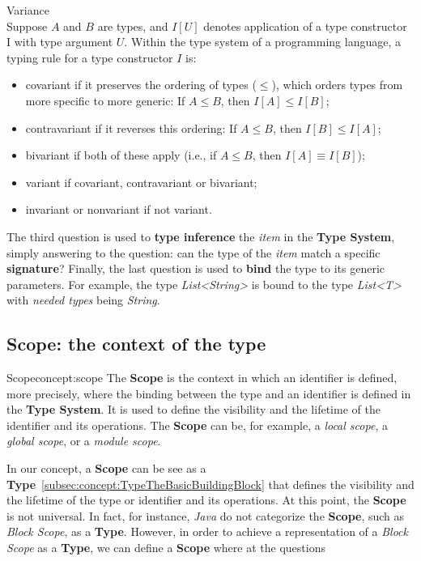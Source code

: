 \begin{definition}{Variance}\\
    Suppose $A$ and $B$ are types, and $I[U]$ denotes application of a type constructor I with type argument $U$. Within the type system of a programming language, a typing rule for a type constructor $I$ is:
    \begin{itemize}
        \item covariant if it preserves the ordering of types ($\leq$), which orders types from more specific to more generic: If $A \leq B$, then $I[A] \leq I[B]$;
        \item contravariant if it reverses this ordering: If $A \leq B$, then $I[B] \leq I[A]$;
        \item bivariant if both of these apply (i.e., if $A \leq B$, then $I[A] \equiv I[B]$);
        \item variant if covariant, contravariant or bivariant;
        \item invariant or nonvariant if not variant.
    \end{itemize}
\end{definition}

The third question is used to \textbf{type inference} the \textit{item} in the \textbf{Type System}, simply answering to the question: can the type of the \textit{item} match a specific \textbf{signature}?
Finally, the last question is used to \textbf{bind} the type to its generic parameters. For example, the type \textit{List<String>} is bound to the type \textit{List<T>} with \textit{needed types} being \textit{String}.


\subsection{Scope: the context of the type}\label{subsec:concept:ScopeTheContextOfTheType}

\begin{mydefinition}{Scope}{concept:scope}
The \textbf{Scope} is the context in which an identifier is defined, more precisely, where the binding between the type and an identifier is defined in the \textbf{Type System}. It is used to define the visibility and the lifetime of the identifier and its operations. The \textbf{Scope} can be, for example, a \textit{local scope}, a \textit{global scope}, or a \textit{module scope}.
\end{mydefinition}

In our concept, a \textbf{Scope} can be see as a \textbf{Type}~\ref{subsec:concept:TypeTheBasicBuildingBlock} that defines the visibility and the lifetime of the type or identifier and its operations. At this point, the \textbf{Scope} is not universal. In fact, for instance, \textit{Java} do not categorize the \textbf{Scope}, such as \textit{Block Scope}, as a \textbf{Type}. However, in order to achieve a representation of a \textit{Block Scope} as a \textbf{Type}, we can define a \textbf{Scope} where at the questions


